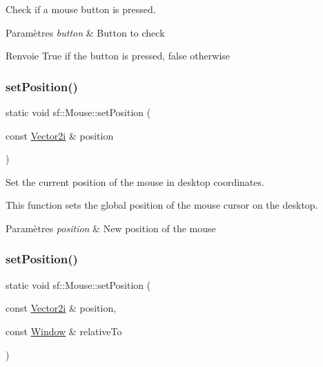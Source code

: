 Check if a mouse button is pressed. 


\begin{DoxyParams}{Paramètres}
{\em button} & Button to check\\
\hline
\end{DoxyParams}
\begin{DoxyReturn}{Renvoie}
True if the button is pressed, false otherwise 
\end{DoxyReturn}
\mbox{\label{classsf_1_1Mouse_a1222e16c583be9e3d176d86e0b7817d7}} 
\subsubsection{\texorpdfstring{set\+Position()}{setPosition()}\hspace{0.1cm}{\footnotesize\ttfamily [1/2]}}
{\footnotesize\ttfamily static void sf\+::\+Mouse\+::set\+Position (\begin{DoxyParamCaption}\item[{const \hyperlink{classsf_1_1Vector2}{Vector2i} \&}]{position }\end{DoxyParamCaption})\hspace{0.3cm}{\ttfamily [static]}}



Set the current position of the mouse in desktop coordinates. 

This function sets the global position of the mouse cursor on the desktop.


\begin{DoxyParams}{Paramètres}
{\em position} & New position of the mouse \\
\hline
\end{DoxyParams}
\mbox{\label{classsf_1_1Mouse_ad9b16ec7041531315f06b26b413dfea8}} 
\subsubsection{\texorpdfstring{set\+Position()}{setPosition()}\hspace{0.1cm}{\footnotesize\ttfamily [2/2]}}
{\footnotesize\ttfamily static void sf\+::\+Mouse\+::set\+Position (\begin{DoxyParamCaption}\item[{const \hyperlink{classsf_1_1Vector2}{Vector2i} \&}]{position,  }\item[{const \hyperlink{classsf_1_1Window}{Window} \&}]{relative\+To }\end{DoxyParamCaption})\hspace{0.3cm}{\ttfamily [static]}}



